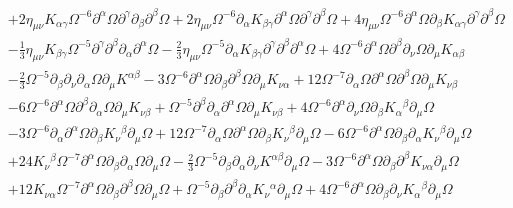 \documentclass[aps]{revtex4}
\begin{document}
\begin{align}
 \nonumber\\
 & + 2 \eta_{\mu \nu} K_{\alpha \gamma} \Omega^{-6} \partial^{\alpha}\Omega \partial^{\gamma}\partial_{\beta}\partial^{\beta}\Omega + 2 \eta_{\mu \nu} \Omega^{-6} \partial_{\alpha}K_{\beta \gamma} \partial^{\alpha}\Omega \partial^{\gamma}\partial^{\beta}\Omega + 4 \eta_{\mu \nu} \Omega^{-6} \partial^{\alpha}\Omega \partial_{\beta}K_{\alpha \gamma} \partial^{\gamma}\partial^{\beta}\Omega 
 \nonumber\\
 &-  \tfrac{1}{3} \eta_{\mu \nu} K_{\beta \gamma} \Omega^{-5} \partial^{\gamma}\partial^{\beta}\partial_{\alpha}\partial^{\alpha}\Omega -  \tfrac{2}{3} \eta_{\mu \nu} \Omega^{-5} \partial_{\alpha}K_{\beta \gamma} \partial^{\gamma}\partial^{\beta}\partial^{\alpha}\Omega + 4 \Omega^{-6} \partial^{\alpha}\Omega \partial^{\beta}\partial_{\nu}\Omega \partial_{\mu}K_{\alpha \beta} 
 \nonumber\\
 &-  \tfrac{2}{3} \Omega^{-5} \partial_{\beta}\partial_{\nu}\partial_{\alpha}\Omega \partial_{\mu}K^{\alpha \beta} - 3 \Omega^{-6} \partial^{\alpha}\Omega \partial_{\beta}\partial^{\beta}\Omega \partial_{\mu}K_{\nu \alpha} + 12 \Omega^{-7} \partial_{\alpha}\Omega \partial^{\alpha}\Omega \partial^{\beta}\Omega \partial_{\mu}K_{\nu \beta} 
 \nonumber\\
 &- 6 \Omega^{-6} \partial^{\alpha}\Omega \partial^{\beta}\partial_{\alpha}\Omega \partial_{\mu}K_{\nu \beta} + \Omega^{-5} \partial^{\beta}\partial_{\alpha}\partial^{\alpha}\Omega \partial_{\mu}K_{\nu \beta} + 4 \Omega^{-6} \partial^{\alpha}\partial_{\nu}\Omega \partial_{\beta}K_{\alpha}{}^{\beta} \partial_{\mu}\Omega 
 \nonumber\\
 &- 3 \Omega^{-6} \partial_{\alpha}\partial^{\alpha}\Omega \partial_{\beta}K_{\nu}{}^{\beta} \partial_{\mu}\Omega + 12 \Omega^{-7} \partial_{\alpha}\Omega \partial^{\alpha}\Omega \partial_{\beta}K_{\nu}{}^{\beta} \partial_{\mu}\Omega - 6 \Omega^{-6} \partial^{\alpha}\Omega \partial_{\beta}\partial_{\alpha}K_{\nu}{}^{\beta} \partial_{\mu}\Omega
 \nonumber\\
 & + 24 K_{\nu}{}^{\beta} \Omega^{-7} \partial^{\alpha}\Omega \partial_{\beta}\partial_{\alpha}\Omega \partial_{\mu}\Omega -  \tfrac{2}{3} \Omega^{-5} \partial_{\beta}\partial_{\alpha}\partial_{\nu}K^{\alpha \beta} \partial_{\mu}\Omega - 3 \Omega^{-6} \partial^{\alpha}\Omega \partial_{\beta}\partial^{\beta}K_{\nu \alpha} \partial_{\mu}\Omega 
 \nonumber\\
 &+ 12 K_{\nu \alpha} \Omega^{-7} \partial^{\alpha}\Omega \partial_{\beta}\partial^{\beta}\Omega \partial_{\mu}\Omega + \Omega^{-5} \partial_{\beta}\partial^{\beta}\partial_{\alpha}K_{\nu}{}^{\alpha} \partial_{\mu}\Omega + 4 \Omega^{-6} \partial^{\alpha}\Omega \partial_{\beta}\partial_{\nu}K_{\alpha}{}^{\beta} \partial_{\mu}\Omega 

\end{align}
\end{document}
